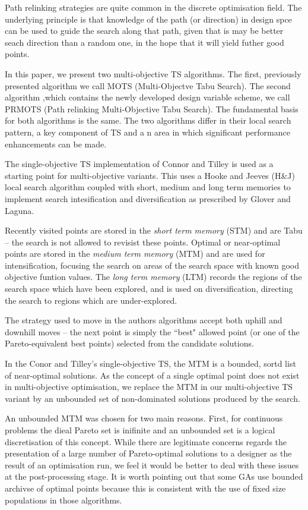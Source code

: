 \documentclass[pdftex,11pt]{article}
\begin{document}
Path relinking strategies are quite common in the discrete optimisation field. The underlying principle is that knowledge of the path (or direction) in design spce can be used to guide the search along that path, given that is may be better seach direction than a random one, in the hope that it will yield futher good points.

In this paper, we present two multi-objective TS algorithms. The first, previously presented algorithm we call MOTS (Multi-Objectve Tabu Search). The second algorithm ,which contains the newly developed design variable scheme, we call PRMOTS (Path relinking Multi-Objective Tabu Search). The fundamental basis for both algorithms is the same. The two algorithms differ in their local search pattern, a key component of TS and a n area in which significant performance enhancements can be made.

The single-objective  TS implementation of Connor and Tilley is used as a starting point for multi-objective variants. This uses a Hooke and Jeeves (H\&J) local search algorithm coupled with short, medium and long term memories to implement search intesification and diversification as prescribed by Glover and Laguna.

Recently visited points are stored in the \emph{short term memory} (STM) and are Tabu -- the search is not allowed to revisist these points. Optimal or near-optimal points are stored in the \emph{medium term memory} (MTM) and are used for intensification, focusing the search on areas of the search space with known good objective funtion values. The \emph{long term memory} (LTM) records the regions of the search space which have been explored, and is used on diversification, directing the search to regions which are under-explored.

The strategy used to move in the authors algorithms accept both uphill and downhill moves -- the next point is simply the ``best" allowed point (or one of the Pareto-equivalent best points) selected from the candidate solutions.

In the Conor and Tilley's single-objective TS, the MTM is a bounded, sortd list of near-optimal solutions. As the concept of a single optimal point does not exist in multi-objective optimisation, we replace the MTM in our multi-objective TS variant by an unbounded set of non-dominated solutions produced by the search.

An unbounded MTM was chosen for two main reasons. First, for continuous problems the dieal Pareto set is inifinite and an unbounded set is a logical discretisation of this concept. While there are legitimate concerns regards the presentation of a large number of Pareto-optimal solutions to a designer as the result of an optimisation run, we feel it would be better to deal with these issues at the post-processing stage. It is worth pointing out that some GAs use bounded archivse of optimal points because this is consistent with the use of fixed size populations in those algorithms.
\end{document}
